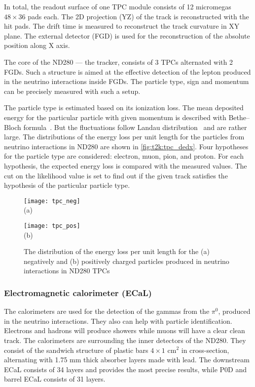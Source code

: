 \documentclass[../main.tex]{subfiles}
\begin{document}
In total, the readout surface of one TPC module consists of 12 micromegas $48\times36$ pads each. The 2D projection (YZ) of the track is reconstructed with the hit pads. The drift time is measured to reconstruct the track curvature in XY plane. The external detector (FGD) is used for the reconstruction of the absolute position along X axis.

The core of the ND280 --- the tracker, consists of 3 TPCs alternated with 2 FGDs. Such a structure is aimed at the effective detection of the lepton produced in the neutrino interactions inside FGDs. The particle type, sign and momentum can be precisely measured with such a setup.

The particle type is estimated based on its ionization loss. The mean deposited energy  for the particular particle with given momentum is described with Bethe--Bloch formula~\cite{Bethe1930}. But the fluctuations follow Landau distribution~\cite{Landau1944} and are rather large. The distributions of the energy loss per unit length for the particles from neutrino interactions in ND280 are shown in \autoref{fig:t2k:tpc_dedx}. Four hypotheses for the particle type are considered: electron, muon, pion, and proton. For each hypothesis, the expected energy loss is compared with the measured values. The cut on the likelihood value is set to find out if the given track satisfies the hypothesis of the particular particle type.

\begin{figure}[!ht]
  \centering
  \begin{minipage}{0.49\linewidth}
    \centering
    \texttt{[image: tpc\_neg]} \\ (a)
  \end{minipage}
  \begin{minipage}{0.49\linewidth}
    \centering
    \texttt{[image: tpc\_pos]} \\ (b)
  \end{minipage}
  \caption{The distribution of the energy loss per unit length for the (a) negatively and (b) positively charged particles produced in neutrino interactions in ND280 TPCs}
  \label{fig:t2k:tpc_dedx}
\end{figure}

\subsubsection{Electromagnetic calorimeter (ECaL)}
The calorimeters are used for the detection of the gammas from the $\pi^0$, produced in the neutrino interactions. They also can help with particle identification. Electrons and hadrons will produce showers while muons will have a clear clean track. The calorimeters are surrounding the inner detectors of the ND280. They consist of the sandwich structure of plastic bars $4\times1$ $\text{cm}^2$ in cross-section, alternating with 1.75 mm thick absorber layers made with lead. The downstream ECaL consists of 34 layers and provides the most precise results, while P0D and barrel ECaL consists of 31 layers.
\end{document}
